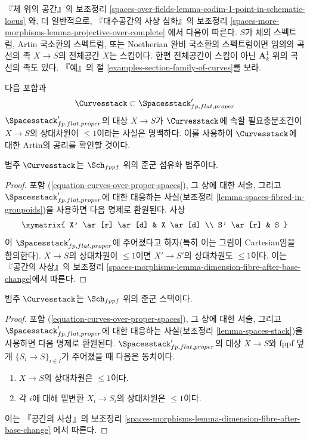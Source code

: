 \noindent
『체 위의 공간』의 보조정리
\ref{spaces-over-fields-lemma-codim-1-point-in-schematic-locus}
와, 더 일반적으로, 『대수공간의 사상 심화』의 보조정리
\ref{spaces-more-morphisms-lemma-projective-over-complete}
에서 다음이 따른다. $S$가 체의 스펙트럼, Artin 국소환의 스펙트럼, 또는
Noetherian 완비 국소환의 스펙트럼이면 임의의 곡선의 족 $X \to S$의
전체공간 $X$는 스킴이다. 한편 전체공간이 스킴이 아닌
$\mathbf{A}^1_k$ 위의 곡선의 족도 있다. 『예』의 절
\ref{examples-section-family-of-curves}를 보라.

\medskip\noindent
다음 포함과
\begin{equation}
\label{equation-curves-over-proper-spaces}
\Curvesstack \subset \Spacesstack'_{fp, flat, proper}
\end{equation}
$\Spacesstack'_{fp, flat, proper}$의 대상 $X \to S$가 $\Curvesstack$에 속할
필요충분조건이 $X \to S$의 상대차원이 $\leq 1$이라는 사실은 명백하다.
이를 사용하여 $\Curvesstack$에 대한 Artin의 공리를 확인할 것이다.

\begin{lemma}
\label{lemma-curves-fibred-in-groupoids}
범주 $\Curvesstack$는 $\Sch_{fppf}$ 위의 준군 섬유화 범주이다.
\end{lemma}

\begin{proof}
포함 (\ref{equation-curves-over-proper-spaces}), 그 상에 대한 서술, 그리고
$\Spacesstack'_{fp, flat, proper}$에 대한 대응하는 사실(보조정리
\ref{lemma-spaces-fibred-in-groupoids})을 사용하면 다음 명제로 환원된다.
사상
$$
\xymatrix{
X' \ar[r] \ar[d] & X \ar[d] \\
S' \ar[r] & S
}
$$
이 $\Spacesstack'_{fp, flat, proper}$에 주어졌다고 하자(특히 이는 그림이
Cartesian임을 함의한다). $X \to S$의 상대차원이 $\leq 1$이면
$X' \to S'$의 상대차원도 $\leq 1$이다. 이는 『공간의 사상』의 보조정리
\ref{spaces-morphisms-lemma-dimension-fibre-after-base-change}에서 따른다.
\end{proof}

\begin{lemma}
\label{lemma-curves-stack}
범주 $\Curvesstack$는 $\Sch_{fppf}$ 위의 준군 스택이다.
\end{lemma}

\begin{proof}
포함 (\ref{equation-curves-over-proper-spaces}), 그 상에 대한 서술, 그리고
$\Spacesstack'_{fp, flat, proper}$에 대한 대응하는 사실(보조정리
\ref{lemma-spaces-stack})을 사용하면 다음 명제로 환원된다.
$\Spacesstack'_{fp, flat, proper}$의 대상 $X \to S$와 fppf 덮개
$\{S_i \to S\}_{i \in I}$가 주어졌을 때 다음은 동치이다.
\begin{enumerate}
\item $X \to S$의 상대차원은 $\leq 1$이다.
\item 각 $i$에 대해 밑변환 $X_i \to S_i$의 상대차원은 $\leq 1$이다.
\end{enumerate}
이는 『공간의 사상』의 보조정리
\ref{spaces-morphisms-lemma-dimension-fibre-after-base-change}
에서 따른다.
\end{proof}

